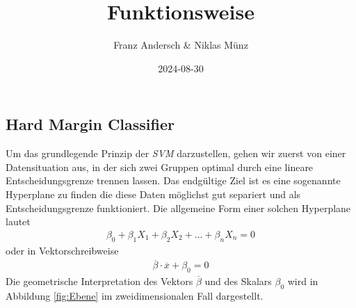 \documentclass[
]{article}
\title{Funktionsweise}
\author{Franz Andersch \& Niklas Münz}
\date{2024-08-30}
\renewcommand{\maketitle}{}
\begin{document}
\maketitle

\subsection{Hard Margin Classifier}

Um das grundlegende Prinzip der \textit{SVM} darzustellen, gehen wir
zuerst von einer Datensituation aus, in der sich zwei Gruppen optimal
durch eine lineare Entscheidungsgrenze trennen lassen. Das endgültige
Ziel ist es eine sogenannte Hyperplane zu finden die diese Daten
möglichst gut separiert und als Entscheidungsgrenze funktioniert. Die
allgemeine Form einer solchen Hyperplane lautet \begin{align}
\beta_0+ \beta_1 X_1+\beta_2 X_2+...+\beta_n X_n=0\label{eq:hyperebene}
\end{align} oder in Vektorschreibweise \begin{align}
\overline{\beta}\cdot\overline{x}+\beta_0=0 \label{eq:hyperplanevec}
\end{align} Die geometrische Interpretation des Vektors
\(\overline{\beta}\) und des Skalars \(\beta_0\) wird in Abbildung
\ref{fig:Ebene} im zweidimensionalen Fall dargestellt.
\end{document}
